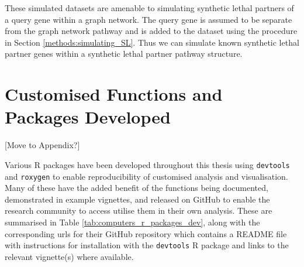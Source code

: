 These simulated datasets are amenable to simulating synthetic lethal partners of a query gene within a graph network. The query gene is assumed to be separate from the graph network pathway and is added to the dataset using the procedure in Section \ref{methods:simulating_SL}. Thus we can simulate known synthetic lethal partner genes within a synthetic lethal partner pathway structure.

\iffalse

	\texttt{[image: \{"/home/tomkelly/Documents/PhD Otago Uni/SL\_Model/graph\_sim\_method/dist\_mat".png]}}
	\texttt{[image: \{"/home/tomkelly/Documents/PhD Otago Uni/SL\_Model/graph\_sim\_method/sigma\_mat".png]}}
		\texttt{[image: \{"/home/tomkelly/Documents/PhD Otago Uni/SL\_Model/graph\_sim\_method/expr\_mat".png]}}
			\texttt{[image: \{"/home/tomkelly/Documents/PhD Otago Uni/SL\_Model/graph\_sim\_method/expr\_cor\_mat".png]}}
		\texttt{[image: \{"/home/tomkelly/Documents/PhD Otago Uni/SL\_Model/graph\_sim\_method/expr\_disc\_mat".png]}}
		
	\texttt{[image: \{"/home/tomkelly/Documents/PhD Otago Uni/SL\_Model/graph\_sim\_method/state\_matrix\_inhibiting".png]}}
	\texttt{[image: \{"/home/tomkelly/Documents/PhD Otago Uni/SL\_Model/graph\_sim\_method/dist\_mat".png]}}
		\texttt{[image: \{"/home/tomkelly/Documents/PhD Otago Uni/SL\_Model/graph\_sim\_method/sigma\_mat\_inhibiting".png]}}
		\texttt{[image: \{"/home/tomkelly/Documents/PhD Otago Uni/SL\_Model/graph\_sim\_method/expr\_inhib\_mat".png]}}
			\texttt{[image: \{"/home/tomkelly/Documents/PhD Otago Uni/SL\_Model/graph\_sim\_method/expr\_inhib\_cor\_mat".png]}}
		\texttt{[image: \{"/home/tomkelly/Documents/PhD Otago Uni/SL\_Model/graph\_sim\_method/expr\_inhib\_disc\_mat".png]}}
	
\fi	

\FloatBarrier

\section{Customised Functions and Packages Developed} \label{methods:r_packages}

[Move to Appendix?]

Various R packages have been developed throughout this thesis using \texttt{devtools} \citep{devtools} and \texttt{roxygen} \citep{roxygen} to enable reproducibility of customised analysis and visualisation. Many of these have the added benefit of the functions being documented, demonstrated in example vignettes, and released on GitHub to enable the research community to access utilise them in their own analysis. These are summarised in Table \ref{tab:computers_r_packages_dev}, along with the corresponding urls for their GitHub repository which contains a README file with instructions for installation with the \texttt{devtools} R package \citep{devtools} and links to the relevant vignette(s) where available.

